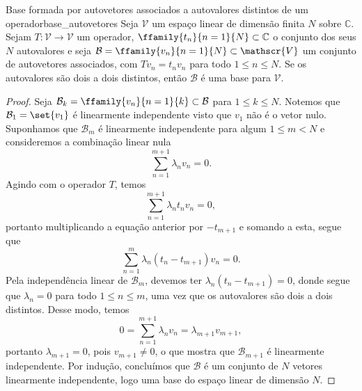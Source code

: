 \begin{lemma}{Base formada por autovetores associados a autovalores distintos de um operador}{base_autovetores}
    Seja \(\mathscr{V}\) um espaço linear de dimensão finita \(N\) sobre \(\mathbb{C}\). Sejam \(T : \mathscr{V} \to \mathscr{V}\) um operador, \(\ffamily{t_n}{n=1}{N} \subset \mathbb{C}\) o conjunto dos seus \(N\) autovalores e seja \(\mathcal{B} = \ffamily{v_n}{n=1}{N} \subset \mathscr{V}\) um conjunto de autovetores associados, com \(Tv_n = t_n v_n\) para todo \(1 \leq n \leq N\). Se os autovalores são dois a dois distintos, então \(\mathcal{B}\) é uma base para \(\mathscr{V}\).
\end{lemma}
\begin{proof}
    Seja \(\mathcal{B}_k = \ffamily{v_n}{n=1}{k}\subset \mathcal{B}\) para \(1 \leq k \leq N\). Notemos que \(\mathcal{B}_1 = \set{v_1}\) é linearmente independente visto que \(v_1\) não é o vetor nulo. Suponhamos que \(\mathcal{B}_m\) é linearmente independente para algum \(1 \leq m < N\) e consideremos a combinação linear nula
    \begin{equation*}
        \sum_{n = 1}^{m+1} \lambda_n v_n = 0.
    \end{equation*}
    Agindo com o operador \(T\), temos
    \begin{equation*}
        \sum_{n=1}^{m+1} \lambda_n t_n v_n = 0,
    \end{equation*}
    portanto multiplicando a equação anterior por \(-t_{m+1}\) e somando a esta, segue que
    \begin{equation*}
        \sum_{n=1}^{m} \lambda_n (t_n - t_{m+1})v_n = 0.
    \end{equation*}
    Pela independência linear de \(\mathcal{B}_m\), devemos ter \(\lambda_n (t_n - t_{m+1}) = 0\), donde segue que \(\lambda_n = 0\) para todo \(1 \leq n \leq m\), uma vez que os autovalores são dois a dois distintos. Desse modo, temos
    \begin{equation*}
        0 = \sum_{n=1}^{m+1} \lambda_n v_n = \lambda_{m+1} v_{m+1},
    \end{equation*}
    portanto \(\lambda_{m+1} = 0\), pois \(v_{m+1} \neq 0\), o que mostra que \(\mathcal{B}_{m+1}\) é linearmente independente. Por indução, concluímos que \(\mathcal{B}\) é um conjunto de \(N\) vetores linearmente independente, logo uma base do espaço linear de dimensão \(N\).
\end{proof}


